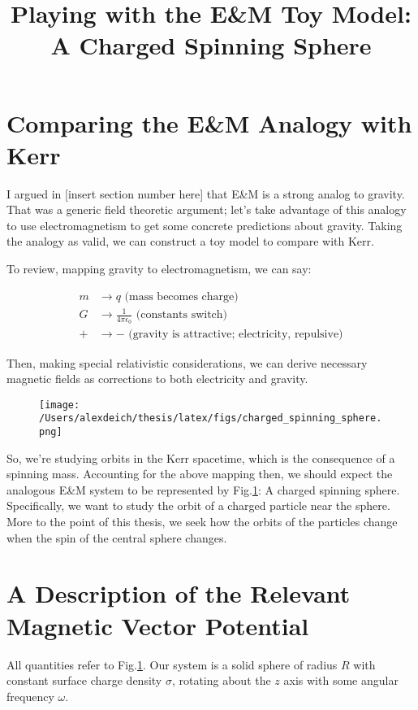 \documentclass[11pt]{article}
\title{Playing with the E\&M Toy Model:\\A Charged Spinning Sphere}
\date{}                                           %
\begin{document}
\maketitle
\section{Comparing the E\&M Analogy with Kerr}
I argued in [insert section number here] that E\&M is a strong analog to gravity.  That was a generic field theoretic argument; let's take advantage of this analogy to use electromagnetism to get some concrete predictions about gravity.  Taking the analogy as valid, we can construct a toy model to compare with Kerr.

To review, mapping gravity to electromagnetism, we can say:

\begin{align}
m &\rightarrow q   \text{ (mass becomes charge)}\\
G &\rightarrow \frac{1}{4\pi\epsilon_0} \text{ (constants switch)}\\
+ &\rightarrow - \text{ (gravity is attractive; electricity, repulsive)}
\end{align}

Then, making special relativistic considerations, we can derive necessary magnetic fields as corrections to both electricity and gravity.
\begin{figure}[h]
  \begin{center}
    \texttt{[image: /Users/alexdeich/thesis/latex/figs/charged\_spinning\_sphere.png]}
  \end{center}
  \caption{}
  \label{fig:charged_spinning_sphere}
\end{figure}

So, we're studying orbits in the Kerr spacetime, which is the consequence of a spinning mass.  Accounting for the above mapping then, we should expect the analogous E\&M system to be represented by Fig.\ref{fig:charged_spinning_sphere}:  A charged spinning sphere.  Specifically, we want to study the orbit of a charged particle near the sphere.  More to the point of this thesis, we seek how the orbits of the particles change when the spin of the central sphere changes.

\section{A Description of the Relevant Magnetic Vector Potential}
All quantities refer to Fig.\ref{fig:charged_spinning_sphere}.  Our system is a solid sphere of radius $R$ with constant surface charge density $\sigma$, rotating about the $z$ axis with some angular frequency $\omega$.
\end{document}

